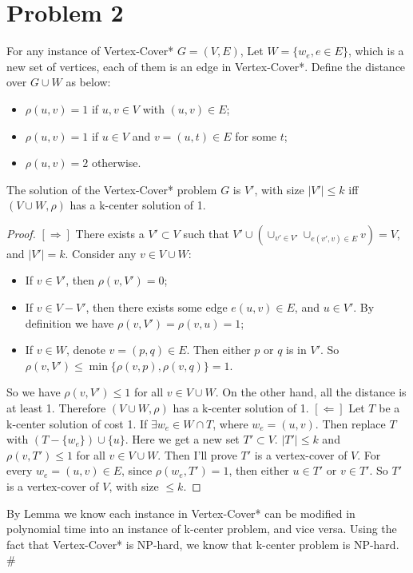 \documentclass[twoside,11pt]{homework}
\begin{document}
\section*{Problem 2}

For any instance of Vertex-Cover* $G = (V,E)$, Let $W = \{w_e, e \in E\}$, which is a new set of vertices, each of them is an edge in Vertex-Cover*. Define the distance over $G \cup W$ as below:
\begin{itemize}
    \item
    $\rho(u,v) = 1$ if $u,v \in V$ with $(u,v) \in E$;
    \item
    $\rho(u,v)=1$ if $u \in V$ and $v = (u,t) \in E$ for some $t$;
    \item
    $\rho (u,v)=2$ otherwise.
\end{itemize}

\begin{lemma}
The solution of the Vertex-Cover* problem $G$ is $V'$, with size $|V'| \leq k$ iff $(V \cup W, \rho)$ has a k-center solution of 1.
\end{lemma}

\begin{proof}
$[\Rightarrow]$ There exists a $V' \subset V$ such that $V' \cup (\cup_{v' \in V'} \cup_{e(v',v) \in E} v)=V$, and $|V'|=k.$ Consider any $v \in V \cup W$:
\begin{itemize}
    \item 
    If $v \in V'$, then $\rho (v, V') =0$;
    \item
    If $v \in V-V'$, then there exists some edge $e(u,v) \in E$, and $u \in V'$. By definition we have $\rho(v,V') = \rho(v,u)=1$; 
    \item
    If $v \in W$, denote $v=(p,q) \in E$. Then either $p$ or $q$ is in $V'$. So $\rho (v, V') \leq \min \{\rho(v,p), \rho(v,q)\}=1$.
\end{itemize}
So we have $\rho(v, V') \leq 1$ for all $v \in V \cup W$. On the other hand, all the distance is at least 1. Therefore $(V \cup W, \rho)$ has a k-center solution of 1.
\newline
\newline
$[\Leftarrow]$ Let $T$ be a k-center solution of cost 1. If $\exists w_e \in W \cap T$, where $w_e = (u,v)$. Then replace $T$ with $(T - \{w_e\})\cup \{u\}$. Here we get a new set $T' \subset V$. $|T'| \leq k$ and $\rho (v, T') \leq 1$ for all $v \in V \cup W$. Then I'll prove $T'$ is a vertex-cover of $V$. For every $w_e = (u,v) \in E$, since $\rho(w_e, T')=1$, then either $u \in T'$ or $v \in T'$. So $T'$ is a vertex-cover of $V$, with size $\leq k$.
\end{proof}
By Lemma we know each instance in Vertex-Cover* can be modified in polynomial time into an instance of k-center problem, and vice versa.
Using the fact that Vertex-Cover* is NP-hard, we know that k-center problem is NP-hard. \#
\newline
\end{document}
